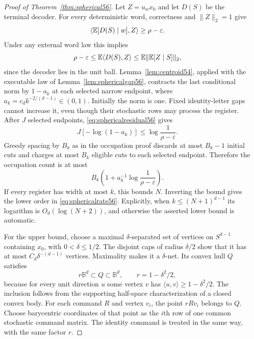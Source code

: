 \begin{proof}[Proof of Theorem~\ref{thm:spherical56}]
Let $Z=u_wx_0$ and let $D(S)$ be the terminal decoder. For every deterministic word, correctness and $\|Z\|_2=1$ give
\[
           \langle\mathbb E[D(S)\mid w],Z\rangle\ge\rho-\varepsilon.
\]
Under any external word law this implies
\begin{equation}\label{eq:sphericalresidual56}
       \rho-\varepsilon\le\mathbb E\langle D(S),Z\rangle
             \le\mathbb E\|\mathbb E[Z\mid S]\|_2,
\end{equation}
since the decoder lies in the unit ball. Lemma~\ref{lem:centroid54}, applied with the executable law of Lemma~\ref{lem:sphericalgap56}, contracts the last conditional norm by $1-a_k$ at each selected narrow endpoint, where $a_k=c_d k^{-2/(d-1)}\in(0,1)$. Initially the norm is one. Fixed identity-letter gaps cannot increase it, even though their stochastic rows may process the register. After $J$ selected endpoints, \eqref{eq:sphericalresidual56} gives
\[
            J[-\log(1-a_k)]\le\log\frac1{\rho-\varepsilon}.
\]
Greedy spacing by $B_k$ as in the occupation proof discards at most $B_k-1$ initial cuts and charges at most $B_k$ eligible cuts to each selected endpoint. Therefore the occupation count is at most
\begin{equation}\label{eq:sphericaloccupation56}
 B_k\left(1+a_k^{-1}\log\frac1{\rho-\varepsilon}\right).
\end{equation}
If every register has width at most $k$, this bounds $N$. Inverting the bound gives the lower order in \eqref{eq:sphericalrate56}. Explicitly, when $k\le(N+1)^{d-1}$ its logarithm is $O_d(\log(N+2))$, and otherwise the asserted lower bound is automatic.

For the upper bound, choose a maximal $\delta$-separated set of vertices on $S^{d-1}$ containing $x_0$, with $0<\delta\le1/2$. The disjoint caps of radius $\delta/2$ show that it has at most $C_d\delta^{-(d-1)}$ vertices. Maximality makes it a $\delta$-net. Its convex hull $Q$ satisfies
\begin{equation}\label{eq:sphericalpolytope56}
                r\mathbb B^d\subset Q\subset\mathbb B^d,
                         \qquad r=1-\delta^2/2,
\end{equation}
because for every unit direction $u$ some vertex $v$ has $\langle u,v\rangle\ge1-\delta^2/2$. The inclusion follows from the supporting half-space characterization of a closed convex body. For each command $R$ and vertex $v_i$, the point $rRv_i$ belongs to $Q$. Choose barycentric coordinates of that point as the $i$th row of one common stochastic command matrix. The identity command is treated in the same way, with the same factor $r$.


\end{proof}
